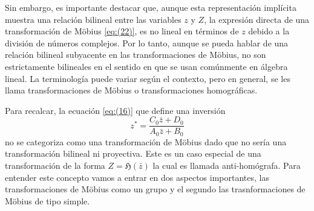 \documentclass{matematicasud}
\begin{document}
Sin embargo, es importante destacar que, aunque esta representación implícita muestra una relación bilineal entre las variables $z$ y $Z$, la expresión directa de una transformación de Möbius \eqref{eq:(22)}, es no lineal en términos de $z$ debido a la división de números complejos. Por lo tanto, aunque se pueda hablar de una relación bilineal subyacente en las transformaciones de Möbius, no son estrictamente bilineales en el sentido en que se usan comúnmente en álgebra lineal. La terminología puede variar según el contexto, pero en general, se les llama transformaciones de Möbius o transformaciones homográficas.

Para recalcar, la ecuación \eqref{eq:(16)} que define una inversión
\begin{equation*}
    z^*=\frac{C_0\bar{z}+D_0}{A_0\bar{z}+B_0}
\end{equation*}
no se categoriza como una transformación de Möbius dado que no sería una transformación bilineal ni proyectiva. Este es un caso especial de una transformación de la forma $Z=\mathfrak{H}(\bar{z})$ la cual es llamada anti-homógrafa. Para entender este concepto vamos a entrar en dos aspectos importantes, las transformaciones de Möbius como un grupo y el segundo las trasnformaciones de Möbius de tipo simple.
\end{document}
